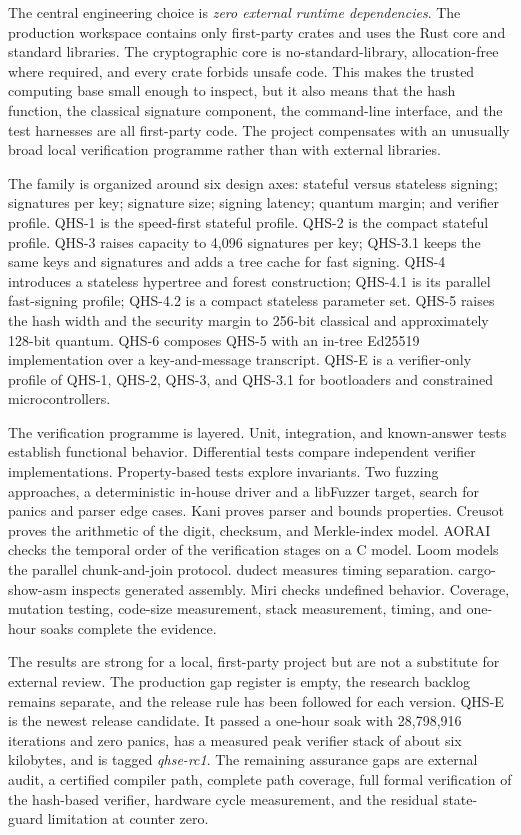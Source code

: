 \documentclass[11pt,a4paper]{article}
\begin{document}
The central engineering choice is \emph{zero external runtime dependencies}.
The production workspace contains only first-party crates and uses the Rust
core and standard libraries. The cryptographic core is no-standard-library,
allocation-free where required, and every crate forbids unsafe code. This makes
the trusted computing base small enough to inspect, but it also means that the
hash function, the classical signature component, the command-line interface,
and the test harnesses are all first-party code. The project compensates with
an unusually broad local verification programme rather than with external
libraries.

The family is organized around six design axes: stateful versus stateless
signing; signatures per key; signature size; signing latency; quantum margin;
and verifier profile. QHS-1 is the speed-first stateful profile. QHS-2 is the
compact stateful profile. QHS-3 raises capacity to 4,096 signatures per key;
QHS-3.1 keeps the same keys and signatures and adds a tree cache for fast
signing. QHS-4 introduces a stateless hypertree and forest construction;
QHS-4.1 is its parallel fast-signing profile; QHS-4.2 is a compact stateless
parameter set. QHS-5 raises the hash width and the security margin to 256-bit
classical and approximately 128-bit quantum. QHS-6 composes QHS-5 with an
in-tree Ed25519 implementation over a key-and-message transcript. QHS-E is a
verifier-only profile of QHS-1, QHS-2, QHS-3, and QHS-3.1 for bootloaders and
constrained microcontrollers.

The verification programme is layered. Unit, integration, and known-answer
tests establish functional behavior. Differential tests compare independent
verifier implementations. Property-based tests explore invariants. Two fuzzing
approaches, a deterministic in-house driver and a libFuzzer target, search for
panics and parser edge cases. Kani proves parser and bounds properties. Creusot
proves the arithmetic of the digit, checksum, and Merkle-index model. AORAI
checks the temporal order of the verification stages on a C model. Loom models
the parallel chunk-and-join protocol. dudect measures timing separation.
cargo-show-asm inspects generated assembly. Miri checks undefined behavior.
Coverage, mutation testing, code-size measurement, stack measurement, timing,
and one-hour soaks complete the evidence.

The results are strong for a local, first-party project but are not a
substitute for external review. The production gap register is empty, the
research backlog remains separate, and the release rule has been followed for
each version. QHS-E is the newest release candidate. It passed a one-hour soak
with 28,798,916 iterations and zero panics, has a measured peak verifier stack
of about six kilobytes, and is tagged \emph{qhse-rc1}. The remaining assurance
gaps are external audit, a certified compiler path, complete path coverage,
full formal verification of the hash-based verifier, hardware cycle
measurement, and the residual state-guard limitation at counter zero.
\end{document}
